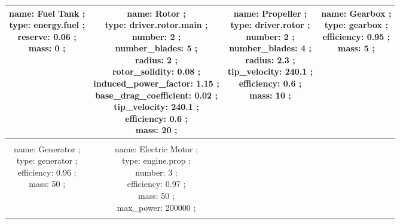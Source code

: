 \begin{table}[h]
\begin{adjustbox}{width=1\textwidth}
\begin{tabular}{|c|c|c|c|}
\makecell{name: Fuel Tank ; \\ type: energy.fuel ; \\ reserve: 0.06 ; \\ mass: 0 ; \\ } & \makecell{name: Rotor ; \\ type: driver.rotor.main ; \\ number: 2 ; \\ number\_blades: 5 ; \\ radius: 2 ; \\ rotor\_solidity: 0.08 ; \\ induced\_power\_factor: 1.15 ; \\ base\_drag\_coefficient: 0.02 ; \\ tip\_velocity: 240.1 ; \\ efficiency: 0.6 ; \\ mass: 20 ; \\ } & \makecell{name: Propeller ; \\ type: driver.rotor ; \\ number: 2 ; \\ number\_blades: 4 ; \\ radius: 2.3 ; \\ tip\_velocity: 240.1 ; \\ efficiency: 0.6 ; \\ mass: 10 ; \\ } & \makecell{name: Gearbox ; \\ type: gearbox ; \\ efficiency: 0.95 ; \\ mass: 5 ; \\ }\\ \hline \\ 
\makecell{name: Generator ; \\ type: generator ; \\ efficiency: 0.96 ; \\ mass: 50 ; \\ } & \makecell{name: Electric Motor ; \\ type: engine.prop ; \\ number: 3 ; \\ efficiency: 0.97 ; \\ mass: 50 ; \\ max\_power: 200000 ; \\ } &  & \\ \hline \\ 
\end{tabular} 
 \end{adjustbox} 
 \end{table} 
 \FloatBarrier 

